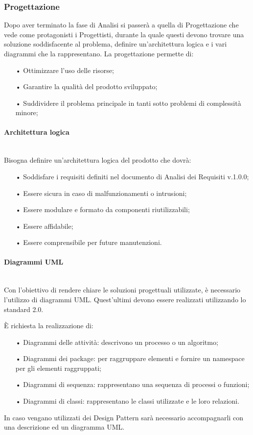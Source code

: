 \subsubsection{Progettazione}
Dopo aver terminato la fase di Analisi si passerà a quella di Progettazione che vede come protagonisti i Progettisti, durante la quale questi devono trovare una soluzione soddisfacente al problema, definire un'architettura logica e i vari diagrammi che la rappresentano.
La progettazione permette di: 
\begin{itemize}
\item[•] Ottimizzare l'uso delle risorse;
\item[•] Garantire la qualità del prodotto sviluppato;
\item[•] Suddividere il problema principale in tanti sotto problemi di complessità minore;
\end{itemize}

\paragraph{Architettura logica}\mbox{}\\
Bisogna definire un'{architettura} logica del prodotto che dovrà: 
\begin{itemize}
\item[•] Soddisfare i requisiti definiti nel documento di Analisi dei Requisiti v.1.0.0;
\item[•] Essere sicura in caso di malfunzionamenti o intrusioni;
\item[•] Essere {modulare} e formato da componenti riutilizzabili;
\item[•] Essere affidabile;
\item[•] Essere comprensibile per future manutenzioni.
\end{itemize}
\paragraph{Diagrammi UML}\mbox{}\\
Con l'obiettivo di rendere chiare le soluzioni progettuali utilizzate, è necessario l'utilizzo di {diagrammi UML}. Quest'ultimi devono essere realizzati utilizzando lo {standard} 2.0.

È richiesta la realizzazione di:
\begin{itemize}
\item[•] Diagrammi delle attività: descrivono un processo o un algoritmo;
\item[•] Diagrammi dei package: per raggruppare elementi e fornire un {namespace} per gli elementi raggruppati;
\item[•] Diagrammi di sequenza: rappresentano una sequenza di processi o funzioni;
\item[•] Diagrammi di classi: rappresentano le classi utilizzate e le loro relazioni.
\end{itemize}
In caso vengano utilizzati dei {Design Pattern} sarà necessario accompagnarli con una descrizione ed un diagramma UML.


